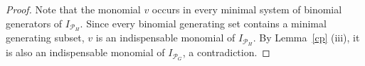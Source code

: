\documentclass[10pt,a4paper]{amsart}
\numberwithin{thm}{section}
\numberwithin{equation}{section}
\def\a{\alpha}
\begin{document}
\begin{proof}
\medskip

Note that the monomial \(v\) occurs in every minimal system of binomial generators of \(I_{\mathcal P_H}\). Since every binomial generating set contains a minimal generating subset, \(v\) is an indispensable monomial of \(I_{\mathcal P_H}\). By Lemma~\ref{cp} (iii), it is also an indispensable monomial of \(I_{\mathcal{P}_G}\), a contradiction.

\bigskip


\end{proof}
\end{document}
